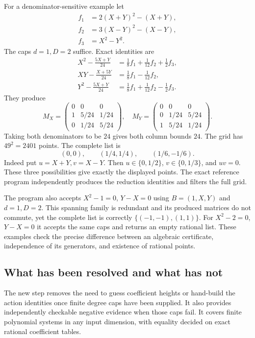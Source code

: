 For a denominator-sensitive example let
\begin{align*}
 f_1&=2(X+Y)^2-(X+Y),\\
 f_2&=3(X-Y)^2-(X-Y),\\
 f_3&=X^2-Y^2.
\end{align*}
The caps $d=1,D=2$ suffice. Exact identities are
\begin{align*}
 X^2-\frac{5X+Y}{24}&=\frac18f_1+\frac1{12}f_2+\frac12f_3,\\
 XY-\frac{X+5Y}{24}&=\frac18f_1-\frac1{12}f_2,\\
 Y^2-\frac{5X+Y}{24}&=\frac18f_1+\frac1{12}f_2-\frac12f_3.
\end{align*}
They produce
\[
 M_X=\begin{pmatrix}0&0&0\\1&5/24&1/24\\0&1/24&5/24\end{pmatrix},
 \quad
 M_Y=\begin{pmatrix}0&0&0\\0&1/24&5/24\\1&5/24&1/24\end{pmatrix}.
\]
Taking both denominators to be $24$ gives both column bounds $24$.
The grid has $49^2=2401$ points. The complete list is
\[
              (0,0),\qquad (1/4,1/4),\qquad(1/6,-1/6).
\]
Indeed put $u=X+Y,v=X-Y$. Then $u\in\{0,1/2\}$,
$v\in\{0,1/3\}$, and $uv=0$. These three possibilities give exactly
the displayed points. The exact reference program independently produces
the reduction identities and filters the full grid.

The program also accepts $X^2-1=0$, $Y-X=0$ using $B=(1,X,Y)$ and
$d=1,D=2$. This spanning family is redundant and its produced matrices
do not commute, yet the complete list is correctly
$\{(-1,-1),(1,1)\}$. For $X^2-2=0$, $Y-X=0$ it accepts the same
caps and returns an empty rational list. These examples check the precise
difference between an algebraic certificate, independence of its
generators, and existence of rational points.

\subsection{What has been resolved and what has not}

The new step removes the need to guess coefficient heights or hand-build
the action identities once finite degree caps have been supplied.
It also provides independently checkable negative evidence when those
caps fail. It covers finite polynomial systems in any input dimension,
with equality decided on exact rational coefficient tables.

